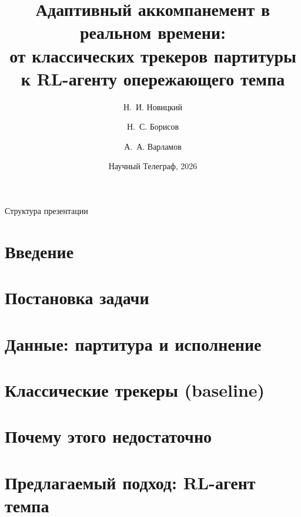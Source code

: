 \documentclass[10pt]{beamer}
\title[Адаптивный аккомпанемент в реальном времени]{%
  Адаптивный аккомпанемент в реальном времени:\\
  от классических трекеров партитуры\\
  к RL-агенту опережающего темпа}
\author[Новицкий, Борисов, Варламов]{Н.~И. Новицкий \and Н.~С. Борисов \and А.~А. Варламов}
\institute[ЦУ]{АНО Центральный Университет, мастерская MusicTech}
\date{Научный Телеграф, 2026}
\begin{document}
\begin{frame}
  \titlepage
\end{frame}

\begin{frame}{Структура презентации}
  \tableofcontents
\end{frame}

\section{Введение}


\section{Постановка задачи}



\section{Данные: партитура и исполнение}



\section{Классические трекеры (baseline)}










\section{Почему этого недостаточно}


\section{Предлагаемый подход: RL-агент темпа}




\end{document}
